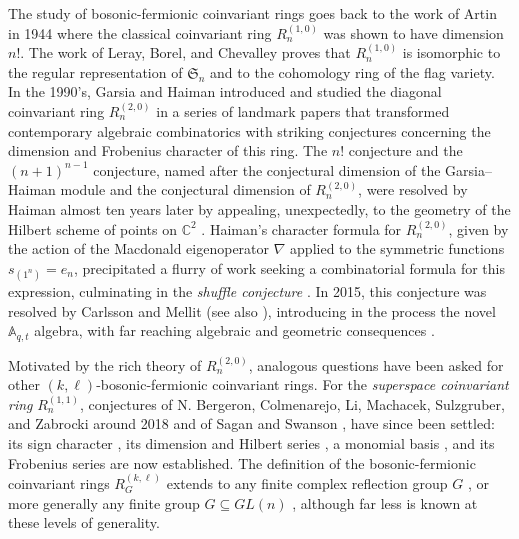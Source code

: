 \documentclass[11pt, reqno]{amsart}
\theoremstyle{definition}
\theoremstyle{remark}
\numberwithin{equation}{section}
\newcommand{\0}{\emptyset}
\newcommand{\C}{\mathbb{C}}
\renewcommand{\S}{\mathfrak{S}}
\begin{document}
The study of bosonic-fermionic coinvariant rings goes back to the work of 
Artin in 1944 \cite{Artin} where the classical coinvariant ring $R_n^{(1,0)}$ 
was shown to have dimension $n!$. 
The work of Leray, Borel, and Chevalley \cites{Leray, Borel, Chevalley} 
proves that $R_n^{(1,0)}$ is isomorphic to the regular representation of $\S_n$ 
and to the cohomology ring of the flag variety. 
In the 1990's, Garsia and Haiman introduced and studied the diagonal coinvariant ring 
$R_n^{(2,0)}$ in a series of landmark papers \cites{GarsiaHaiman1993, Garsia-Haiman, Haiman1994} 
that transformed contemporary algebraic combinatorics with striking conjectures 
concerning the dimension and Frobenius character of this ring. 
The $n!$ conjecture and the $(n+1)^{n-1}$ conjecture, named after 
the conjectural dimension of the Garsia--Haiman module and the conjectural dimension of 
$R_n^{(2,0)}$, were resolved by Haiman almost ten years later by appealing, unexpectedly, 
to the geometry of the Hilbert scheme of points on $\C^2$ \cites{Haiman2002, Haiman-polygraph}. 
Haiman's character formula for $R_n^{(2,0)}$, given by the action of the Macdonald eigenoperator 
$\nabla$ \cite{BergeronGarsia} applied to the symmetric functions $s_{(1^n)} = e_n$, 
precipitated a flurry of work seeking a combinatorial formula for this expression, 
culminating in the \emph{shuffle conjecture} \cite{HHLRU2005}. 
In 2015, this conjecture was resolved by Carlsson and Mellit \cite{CarlssonMellit2018} 
(see also \cites{Mellit, BHMPS-Paths, GSV-shuffle}), introducing in the process the novel 
$\mathbb{A}_{q,t}$ algebra, with far reaching algebraic and geometric 
consequences \cites{CGM-aqt, GGS-calibrated, GGS-elliptic, GGS-smooth}.  
    
Motivated by the rich theory of $R_n^{(2,0)}$, 
analogous questions have been asked for other $(k,\ell)$-bosonic-fermionic coinvariant rings. 
For the \emph{superspace coinvariant ring} $R_n^{(1,1)}$, conjectures of 
N. Bergeron, Colmenarejo, Li, Machacek, Sulzgruber, and Zabrocki around 2018 
and of Sagan and Swanson \cite{SaganSwanson2024}, have since been settled: 
its sign character \cite{SwansonWallach1}, 
its dimension and Hilbert series \cite{RhoadesWilson2023}, 
a monomial basis \cites{Angarone2024}, 
and its Frobenius series \cite{MuraiRhoadesWilson} are now established. 
The definition of the bosonic-fermionic coinvariant rings $R_G^{(k,\ell)}$ extends to any finite complex reflection group $G$ \cite{Bergeron2013}, or more generally any finite group $G \subseteq GL(n)$ \cite{Lentfer-Supersymmetry}, although far less is known at these levels of generality. 
\end{document}
